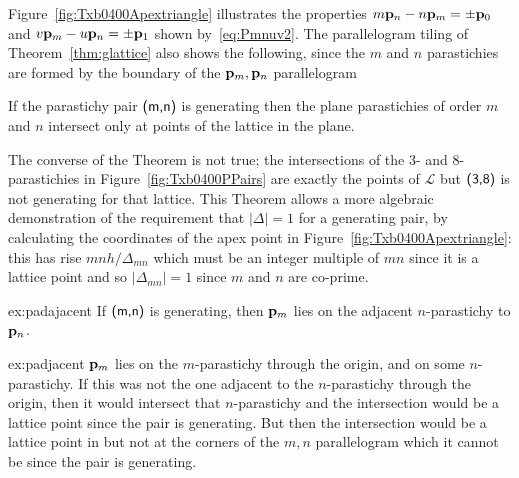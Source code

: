 Figure~\ref{fig:Txb0400Apextriangle} illustrates the properties $m{\mathbf p}_{n}-n{\mathbf p}_{m}=\pm{\mathbf p}_{0}$ and $v{\mathbf p}_{m}-u{\mathbf p}_{n}=\pm{\mathbf p}_{1}$ shown by~\eqref{eq:Pmnuv2}.
%
%
%
The parallelogram tiling of Theorem~\ref{thm:glattice} also shows the following, since the $m$ and $n$ parastichies are formed by the boundary of the ${\mathbf p}_{m},{\mathbf p}_{n}$ parallelogram
\begin{theorem}
	\label{thm:planeintersect}
	If the parastichy pair $\textsf{(m,n)}$ is generating then the plane parastichies of order $m$ and $n$ intersect only at points of the lattice in the plane.
\end{theorem}
The converse of the Theorem is not true; the intersections of the 3- and 8-parastichies in  Figure~\ref{fig:Txb0400PPairs} are exactly the points of $\mathcal{L}$ but $\textsf{(3,8)}$ is not generating for that lattice. 
This Theorem allows a more algebraic demonstration of the requirement that $|\Delta|=1$ for a generating pair,  by calculating the coordinates of the apex point in Figure~\ref{fig:Txb0400Apextriangle}: this has rise $mnh/\Delta_{mn}$ which must be an integer multiple of $mn$ since it is a lattice point and so $|\Delta_{mn}|=1$ since $m$ and $n$ are co-prime.  

	
\begin{jExercise}{ex:padajacent}
	If $\textsf{(m,n)}$ is generating, then ${\mathbf p}_{m}$ lies on the adjacent $n$-parastichy to ${\mathbf p}_{n}$. 
\end{jExercise}

\begin{jAnswer}{ex:padjacent}
	${\mathbf p}_{m}$ lies on the $m$-parastichy through the origin, and on some $n$-parastichy. If this was not the one adjacent to the $n$-parastichy through the origin, then it would intersect that $n$-parastichy and the intersection would be a lattice point since the pair is generating. But then the intersection would be a lattice point in but not at the corners of the $m,n$ parallelogram which it cannot be since the pair is generating. 
\end{jAnswer}

